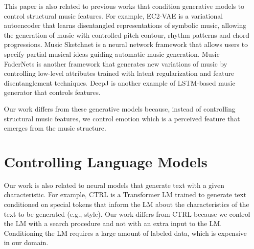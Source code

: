 This paper is also related to previous works that condition generative models to control structural music features. For example, EC2-VAE \cite{yang2019deep} is a variational autoencoder that learns disentangled representations of symbolic music, allowing the generation of music with controlled pitch contour, rhythm patterns and chord progressions. Music Sketchnet \cite{chen2020music} is a neural network framework that allows users to specify partial musical ideas guiding automatic music generation.  Music FaderNets \cite{tan2020music} is another framework that generates new variations of music by controlling low-level attributes trained with latent regularization and feature disentanglement techniques.
DeepJ \cite{} is another example of LSTM-based music generator that controls features.

Our work differs from these generative models because, instead of controlling structural music features, we control emotion which is a perceived feature that emerges from the music structure.

\section{Controlling Language Models}

Our work is also related
to neural models that generate text with a given characteristic.
For example, CTRL \cite{keskar2019ctrl} is a
Transformer LM trained to generate text conditioned on
special tokens that inform the LM about the characteristics of the text to be generated (e.g., style).
Our work differs
from CTRL because we control the LM with
a search procedure and not with an extra input to the LM. Conditioning the LM requires a large amount of labeled data, which is expensive
in our domain. %


